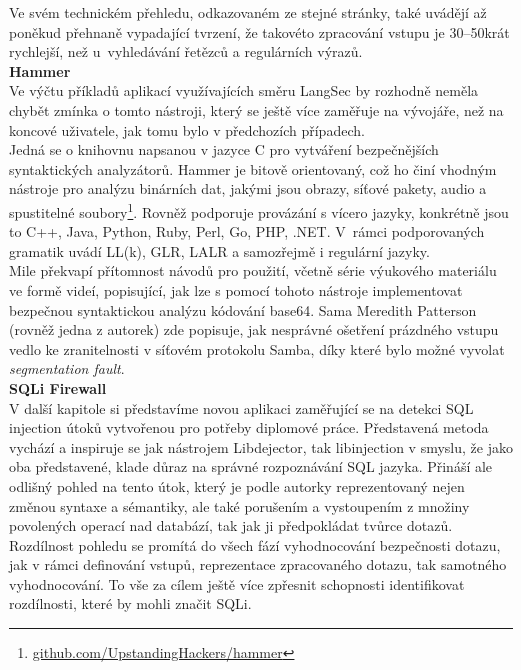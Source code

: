 Ve svém technickém přehledu, odkazovaném ze stejné stránky, také uvádějí až poněkud přehnaně vypadající tvrzení, že takovéto zpracování vstupu 
je 30--50krát rychlejší, než u~vyhledávání řetězců a regulárních výrazů. \\

\Bat{} \textbf{Hammer} \\
Ve výčtu příkladů aplikací využívajících směru LangSec by rozhodně neměla chybět zmínka o tomto nástroji, který se ještě více zaměřuje na vývojáře,
než na koncové uživatele, jak tomu bylo v předchozích případech. \\

Jedná se o knihovnu napsanou v jazyce C pro vytváření bezpečnějších syntaktických analyzátorů. Hammer je bitově orientovaný, což ho činí vhodným nástroje
pro analýzu binárních dat, jakými jsou obrazy, síťové pakety, audio a spustitelné soubory\footnote{\url{github.com/UpstandingHackers/hammer}}.
Rovněž podporuje provázání s vícero jazyky, konkrétně jsou to C++, Java, Python, Ruby, Perl, Go, PHP, .NET. V~rámci podporovaných gramatik uvádí LL(k), 
GLR, LALR a samozřejmě i regulární jazyky.\\

Mile překvapí přítomnost návodů pro použití, včetně série výukového materiálu ve formě videí, popisující, jak lze s pomocí tohoto nástroje implementovat 
bezpečnou syntaktickou analýzu kódování base64. Sama Meredith Patterson (rovněž jedna z autorek) zde popisuje, jak nesprávné ošetření prázdného vstupu 
vedlo ke zranitelnosti v síťovém protokolu Samba, díky které bylo možné vyvolat \textit{segmentation fault}. \\
\newpage
\Bat{} \textbf{SQLi Firewall} \\
V další kapitole si představíme novou aplikaci zaměřující se na detekci SQL injection útoků vytvořenou pro potřeby diplomové práce. 
Představená metoda vychází a inspiruje se jak nástrojem Libdejector, tak libinjection v smyslu, že jako oba představené, klade důraz na správné
rozpoznávání SQL jazyka. Přináší ale odlišný pohled na tento útok, který je podle autorky reprezentovaný nejen změnou syntaxe a sémantiky, ale
také porušením a vystoupením z množiny povolených operací nad databází, tak jak ji předpokládat tvůrce dotazů. Rozdílnost pohledu se promítá
do všech fází vyhodnocování bezpečnosti dotazu, jak v rámci definování vstupů, reprezentace zpracovaného dotazu, tak samotného vyhodnocování.
To vše za cílem ještě více zpřesnit schopnosti identifikovat rozdílnosti, které by mohli značit SQLi.

